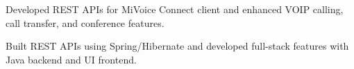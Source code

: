 \begin{minipage}[t]{0.66\textwidth}
\begin{tightemize}
\item Developed REST APIs for MiVoice Connect client and enhanced VOIP calling, call transfer, and conference features.
\end{tightemize}
\sectionsep

\begin{tightemize}
\item Built REST APIs using Spring/Hibernate and developed full-stack features with Java backend and UI frontend.
\end{tightemize}

%
%

\end{minipage}%
\hfill
